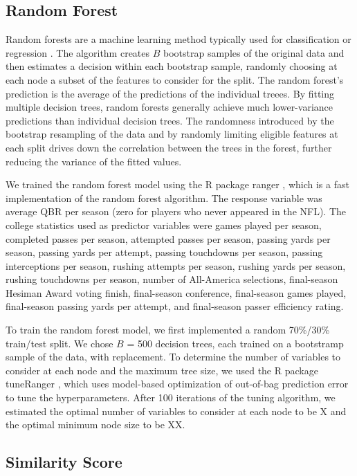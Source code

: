 \documentclass{article}
\begin{document}
\subsection{Random Forest}

Random forests are a machine learning method typically used for classification or regression \citep{breiman_random_2001}. The algorithm creates $B$ bootstrap samples of the original data and then estimates a decision within each bootstrap sample, randomly choosing at each node a subset of the features to consider for the split. The random forest's prediction is the average of the predictions of the individual treees. By fitting multiple decision trees, random forests generally achieve much lower-variance predictions than individual decision trees. The randomness introduced by the bootstrap resampling of the data and by randomly limiting eligible features at each split drives down the correlation between the trees in the forest, further reducing the variance of the fitted values.

We trained the random forest model using the R package ranger \citep{wright_ranger_2015}, which is a fast implementation of the random forest algorithm. The response variable was average QBR per season (zero for players who never appeared in the NFL). The college statistics used as predictor variables were games played per season, completed passes per season, attempted passes per season, passing yards per season, passing yards per attempt, passing touchdowns per season, passing interceptions per season, rushing attempts per season, rushing yards per season, rushing touchdowns per season, number of All-America selections, final-season Hesiman Award voting finish, final-season conference, final-season games played, final-season passing yards per attempt, and final-season passer efficiency rating.

To train the random forest model, we first implemented a random 70\%/30\% train/test split. We chose $B$ = 500 decision trees, each trained on a bootstramp sample of the data, with replacement. To determine the number of variables to consider at each node and the maximum tree size, we used the R package tuneRanger \citep{probst_tuneranger_2018}, which uses model-based optimization of out-of-bag prediction error to tune the hyperparameters. After 100 iterations of the tuning algorithm, we estimated the optimal number of variables to consider at each node to be X and the optimal minimum node size to be XX.

\subsection{Similarity Score}
\end{document}

